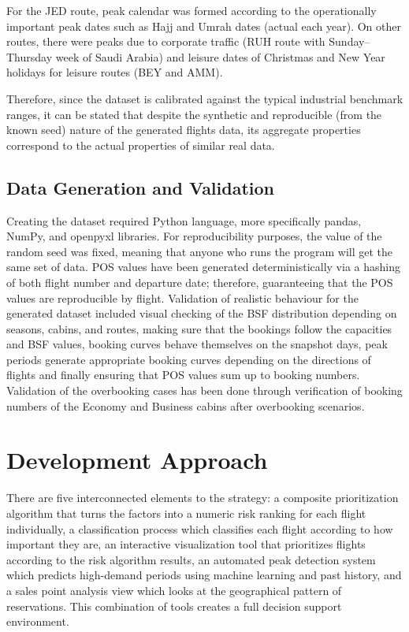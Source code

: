 For the JED route, peak calendar was formed according to the operationally important peak dates such as Hajj and Umrah dates (actual each year). On other routes, there were peaks due to corporate traffic (RUH route with Sunday--Thursday week of Saudi Arabia) and leisure dates of Christmas and New Year holidays for leisure routes (BEY and AMM).

Therefore, since the dataset is calibrated against the typical industrial benchmark ranges, it can be stated that despite the synthetic and reproducible (from the known seed) nature of the generated flights data, its aggregate properties correspond to the actual properties of similar real data.

\subsection{Data Generation and Validation}

Creating the dataset required Python language, more specifically pandas, NumPy, and openpyxl libraries. For reproducibility purposes, the value of the random seed was fixed, meaning that anyone who runs the program will get the same set of data. POS values have been generated deterministically via a hashing of both flight number and departure date; therefore, guaranteeing that the POS values are reproducible by flight. Validation of realistic behaviour for the generated dataset included visual checking of the BSF distribution depending on seasons, cabins, and routes, making sure that the bookings follow the capacities and BSF values, booking curves behave themselves on the snapshot days, peak periods generate appropriate booking curves depending on the directions of flights and finally ensuring that POS values sum up to booking numbers. Validation of the overbooking cases has been done through verification of booking numbers of the Economy and Business cabins after overbooking scenarios.

\section{Development Approach}

There are five interconnected elements to the strategy: a composite prioritization algorithm that turns the factors into a numeric risk ranking for each flight individually, a classification process which classifies each flight according to how important they are, an interactive visualization tool that prioritizes flights according to the risk algorithm results, an automated peak detection system which predicts high-demand periods using machine learning and past history, and a sales point analysis view which looks at the geographical pattern of reservations. This combination of tools creates a full decision support environment.


